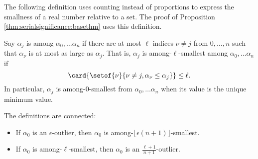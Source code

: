 \documentclass[12pt]{article}
\begin{document}
The following definition uses counting instead of proportions to express
the smallness of a real number relative to a set.  The proof of
Proposition~%
\ref{thm:serialsignificance:basethm} uses this definition.

\begin{definition}
    Say \( \alpha_j \) is %
    among \( \alpha_0, \dots \alpha_n \) if there are at most \( \ell \)
    indices \( \nu \ne j \) from \( 0, \dots, n \) such that \( \alpha_{\nu}
    \) is at most as large as \( \alpha_j \).  That is, \( \alpha_j \)
    is among-\( \ell \)-smallest among \( \alpha_0, \dots \alpha_n \) if
    \[
        \card{ \setof{\nu}{\nu \ne j, \alpha_{\nu} \le \alpha_j}} \le
        \ell.
    \] In particular, \( \alpha_j \) is among-\( 0 \)-smallest from \(
    \alpha_0, \dots \alpha_n \) when its value is the unique minimum
    value.
\end{definition}

\begin{remark}
    The definitions are connected:
    \begin{itemize}
        \item
            If \( \alpha_0 \) is an \( \epsilon \)-outlier, then \(
            \alpha_0 \) is among-\( \lfloor \epsilon (n+1) \rfloor \)-smallest.
        \item
            If \( \alpha_0 \) is among-\( \ell \)-smallest, then \(
            \alpha_0 \) is an \( \frac{\ell + 1}{n+1} \)-outlier.
    \end{itemize}
\end{remark}
\end{document}
